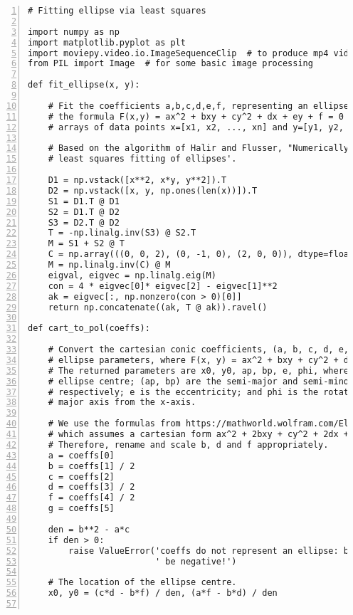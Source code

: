 \documentclass[oneside,10pt]{book}
\begin{document}
\begin{lstlisting}[numbers=left]
# Fitting ellipse via least squares

import numpy as np
import matplotlib.pyplot as plt
import moviepy.video.io.ImageSequenceClip  # to produce mp4 video
from PIL import Image  # for some basic image processing

def fit_ellipse(x, y):

    # Fit the coefficients a,b,c,d,e,f, representing an ellipse described by
    # the formula F(x,y) = ax^2 + bxy + cy^2 + dx + ey + f = 0 to the provided
    # arrays of data points x=[x1, x2, ..., xn] and y=[y1, y2, ..., yn].

    # Based on the algorithm of Halir and Flusser, "Numerically stable direct
    # least squares fitting of ellipses'.

    D1 = np.vstack([x**2, x*y, y**2]).T
    D2 = np.vstack([x, y, np.ones(len(x))]).T
    S1 = D1.T @ D1
    S2 = D1.T @ D2
    S3 = D2.T @ D2
    T = -np.linalg.inv(S3) @ S2.T
    M = S1 + S2 @ T
    C = np.array(((0, 0, 2), (0, -1, 0), (2, 0, 0)), dtype=float)
    M = np.linalg.inv(C) @ M
    eigval, eigvec = np.linalg.eig(M)
    con = 4 * eigvec[0]* eigvec[2] - eigvec[1]**2
    ak = eigvec[:, np.nonzero(con > 0)[0]]
    return np.concatenate((ak, T @ ak)).ravel()

def cart_to_pol(coeffs):

    # Convert the cartesian conic coefficients, (a, b, c, d, e, f), to the
    # ellipse parameters, where F(x, y) = ax^2 + bxy + cy^2 + dx + ey + f = 0.
    # The returned parameters are x0, y0, ap, bp, e, phi, where (x0, y0) is the
    # ellipse centre; (ap, bp) are the semi-major and semi-minor axes,
    # respectively; e is the eccentricity; and phi is the rotation of the semi-
    # major axis from the x-axis.

    # We use the formulas from https://mathworld.wolfram.com/Ellipse.html
    # which assumes a cartesian form ax^2 + 2bxy + cy^2 + 2dx + 2fy + g = 0.
    # Therefore, rename and scale b, d and f appropriately.
    a = coeffs[0]
    b = coeffs[1] / 2
    c = coeffs[2]
    d = coeffs[3] / 2
    f = coeffs[4] / 2
    g = coeffs[5]

    den = b**2 - a*c
    if den > 0:
        raise ValueError('coeffs do not represent an ellipse: b^2 - 4ac must'
                         ' be negative!')

    # The location of the ellipse centre.
    x0, y0 = (c*d - b*f) / den, (a*f - b*d) / den


\end{lstlisting}
\end{document}

